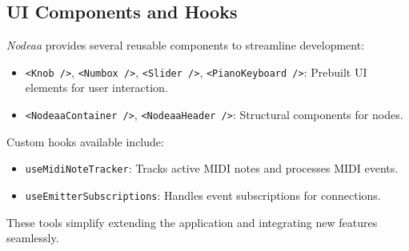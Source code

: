 \documentclass[10pt,twocolumn]{article}
\begin{document}
\subsection{UI Components and Hooks}
\textit{Nodeaa} provides several reusable components to streamline development:
\begin{itemize}
    \item \texttt{\textless{}Knob /\textgreater{}}, \texttt{\textless{}Numbox /\textgreater{}}, \texttt{\textless{}Slider /\textgreater{}}, \texttt{\textless{}PianoKeyboard /\textgreater{}}: Prebuilt UI elements for user interaction.
    \item \texttt{\textless{}NodeaaContainer /\textgreater{}}, \texttt{\textless{}NodeaaHeader /\textgreater{}}: Structural components for nodes.
    \end{itemize}
Custom hooks available include:
\begin{itemize}
    \item \texttt{useMidiNoteTracker}: Tracks active MIDI notes and processes MIDI events.
    \item \texttt{useEmitterSubscriptions}: Handles event subscriptions for connections.
\end{itemize}

These tools simplify extending the application and integrating new features seamlessly.

\printbibliography
\end{document}
